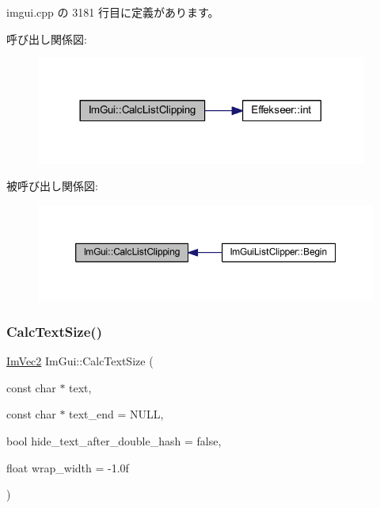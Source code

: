  imgui.\+cpp の 3181 行目に定義があります。

呼び出し関係図\+:\nopagebreak
\begin{figure}[H]
\begin{center}
\leavevmode
\includegraphics[width=308pt]{namespace_im_gui_ae5319370628374ef8febf0c25c285b7e_cgraph}
\end{center}
\end{figure}
被呼び出し関係図\+:\nopagebreak
\begin{figure}[H]
\begin{center}
\leavevmode
\includegraphics[width=350pt]{namespace_im_gui_ae5319370628374ef8febf0c25c285b7e_icgraph}
\end{center}
\end{figure}
\mbox{\label{namespace_im_gui_a848b9db6cc4a186751c0ecebcaadc33b}} 
\subsubsection{\texorpdfstring{Calc\+Text\+Size()}{CalcTextSize()}}
{\footnotesize\ttfamily \mbox{\hyperlink{struct_im_vec2}{Im\+Vec2}} Im\+Gui\+::\+Calc\+Text\+Size (\begin{DoxyParamCaption}\item[{const char $\ast$}]{text,  }\item[{const char $\ast$}]{text\+\_\+end = {\ttfamily NULL},  }\item[{bool}]{hide\+\_\+text\+\_\+after\+\_\+double\+\_\+hash = {\ttfamily false},  }\item[{float}]{wrap\+\_\+width = {\ttfamily -\/1.0f} }\end{DoxyParamCaption})}



